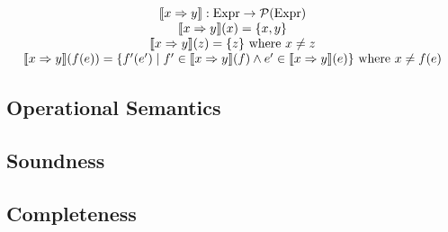 \documentclass[runningheads]{llncs}
\begin{document}
\[
  \begin{array}{c}
    \llbracket x \Rightarrow y \rrbracket : \textnormal{Expr} \rightarrow \mathcal{P}(\textnormal{Expr})
    \\
    \llbracket x \Rightarrow y \rrbracket(x) = \{x, y\}
    \\
    \llbracket x \Rightarrow y \rrbracket(z) = \{z\}\textnormal{ where $x\neq z$}
    \\
    \llbracket x \Rightarrow y \rrbracket(f(e)) = \{ f'(e') \mid f' \in \llbracket x \Rightarrow y \rrbracket(f) \land e' \in \llbracket x \Rightarrow y \rrbracket(e) \}
        \textnormal{ where $x \neq f(e)$}
  \end{array}
\]


\subsection{Operational Semantics}

\subsection{Soundness}

\subsection{Completeness}




\end{document}
